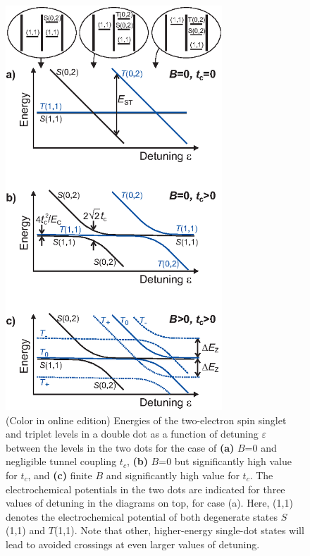 \documentclass[rmp,twocolumn,aps]{revtex4}
\begin{document}
\begin{figure}[htb]
\includegraphics[width=3.2in, clip=true]{hanson_fig32.eps}
\caption{(Color in online edition) Energies of the two-electron spin singlet and triplet
levels in a double dot as a function of detuning $\varepsilon$ between the
levels in the two dots for the case of \textbf{(a)} $B$=0 and
negligible tunnel coupling $t_c$, \textbf{(b)} $B$=0 but
significantly high value for $t_c$, and \textbf{(c)} finite $B$
and significantly high value for $t_c$. The electrochemical potentials in the two dots are indicated for three values of detuning in the diagrams on top, for case (a). Here, (1,1) denotes the electrochemical potential of both degenerate states $S$(1,1) and $T$(1,1). Note that other, higher-energy single-dot states will lead to avoided crossings at even larger values of detuning.}
\label{fig:DDSpinEnergies}
\end{figure}
\end{document}
